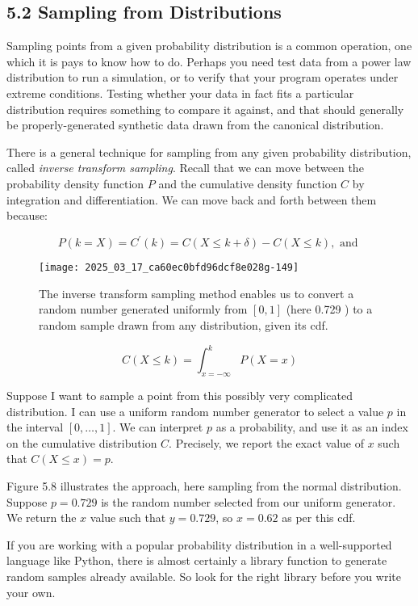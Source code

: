 \documentclass[10pt]{article}
\begin{document}
\subsection*{5.2 Sampling from Distributions}
Sampling points from a given probability distribution is a common operation, one which it is pays to know how to do. Perhaps you need test data from a power law distribution to run a simulation, or to verify that your program operates under extreme conditions. Testing whether your data in fact fits a particular distribution requires something to compare it against, and that should generally be properly-generated synthetic data drawn from the canonical distribution.

There is a general technique for sampling from any given probability distribution, called \emph{inverse transform sampling}. Recall that we can move between the probability density function $P$ and the cumulative density function $C$ by integration and differentiation. We can move back and forth between them because:

\[
P(k=X)=C^{\prime}(k)=C(X \leq k+\delta)-C(X \leq k), \text { and }
\]

\begin{figure}[h]
\centering
\texttt{[image: 2025\_03\_17\_ca60ec0bfd96dcf8e028g-149]}
\caption{The inverse transform sampling method enables us to convert a random number generated uniformly from $[0,1]$ (here 0.729 ) to a random sample drawn from any distribution, given its cdf.}
\end{figure}

\[
C(X \leq k)=\int_{x=-\infty}^{k} P(X=x)
\]

Suppose I want to sample a point from this possibly very complicated distribution. I can use a uniform random number generator to select a value $p$ in the interval $[0, \ldots, 1]$. We can interpret $p$ as a probability, and use it as an index on the cumulative distribution $C$. Precisely, we report the exact value of $x$ such that $C(X \leq x)=p$.

Figure 5.8 illustrates the approach, here sampling from the normal distribution. Suppose $p=0.729$ is the random number selected from our uniform generator. We return the $x$ value such that $y=0.729$, so $x=0.62$ as per this cdf.

If you are working with a popular probability distribution in a well-supported language like Python, there is almost certainly a library function to generate random samples already available. So look for the right library before you write your own.
\end{document}
